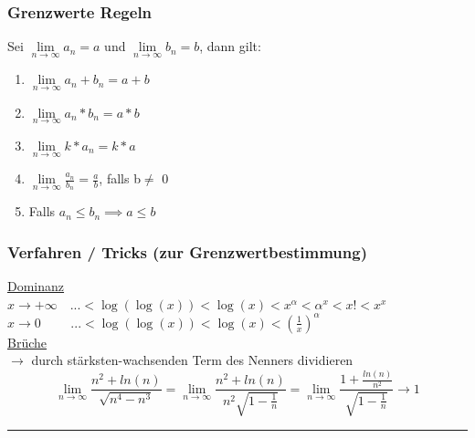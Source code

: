 \documentclass[6pt]{article}
\begin{document}
\begin{multicols*}{3}
\subsubsection*{Grenzwerte Regeln}
Sei $\lim\limits_{n \to \infty}  a_n=a$ und $\lim\limits_{n \to \infty} b_n=b$, dann gilt: \newline
\vspace{-5mm}
\begin{enumerate}[label=(\roman*)]
	\item $\lim\limits_{n \to \infty}  a_n + b_n=a + b$ 
	\item $\lim\limits_{n \to \infty}  a_n * b_n=a * b$
	\item $\lim\limits_{n \to \infty}  k * a_n= k * a$
	\item $\lim\limits_{n \to \infty}  \frac{a_n}{b_n}= \frac{a}{b}$, falls b$\not=$ 0
	\item Falls $a_n \leq b_n \implies a \leq b$
\end{enumerate}
\vspace{0mm}

	\subsubsection*{Verfahren / Tricks (zur Grenzwertbestimmung)}   

	\underline{Dominanz}  \\
	$x \to +\infty \quad... < \log(\log(x)) < \log(x) < x^\alpha < \alpha^x < x! < x^x$ \\
	$x \to 0 \quad \>\>\>\>\>\>... < \log(\log(x)) < \log(x) < (\frac{1}{x})^\alpha$ \\

   \underline{Br{\"u}che}  \\
   			$\rightarrow$ durch st{\"a}rksten-wachsenden Term des Nenners dividieren 
   			\begin{equation*}
  					\lim\limits_{n \to \infty} \frac{n^2 + ln(n)}{\sqrt{n^4-n^3}} = 
  					\lim\limits_{n \to \infty} \frac{n^2 + ln(n)}{n^2 \sqrt{1- \frac{1}{n}}} =
  					\lim\limits_{n \to \infty} \frac{1 + \frac{ln(n)}{n^2}}{\sqrt{1- \frac{1}{n}}} 
					\rightarrow 1
			\end{equation*} \vspace{1mm}
		\vspace{-2mm}
  			\noindent\textcolor{gray}{\rule{9cm}{0.1pt}}
		\vspace{-2mm}\\
		
			
			

\end{multicols*}
\end{document}
